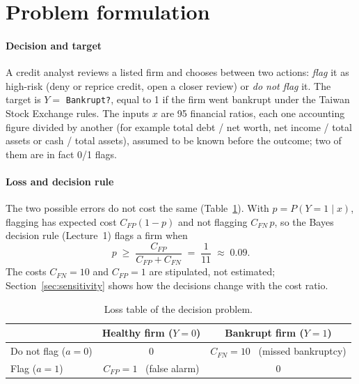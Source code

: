 \documentclass[11pt,a4paper]{article}
\newcommand{\tablefont}{\sffamily\small}
\begin{document}
\section{Problem formulation}

\paragraph{Decision and target} A credit analyst reviews a listed firm and chooses between two actions: \emph{flag} it as high-risk (deny or reprice credit, open a closer review) or \emph{do not flag} it. The target is $Y = $ \texttt{Bankrupt?}, equal to 1 if the firm went bankrupt under the Taiwan Stock Exchange rules. The inputs $x$ are 95 financial ratios, each one accounting figure divided by another (for example total debt / net worth, net income / total assets or cash / total assets), assumed to be known before the outcome; two of them are in fact 0/1 flags.

\paragraph{Loss and decision rule} The two possible errors do not cost the same (Table~\ref{tab:loss}). With $p = P(Y=1 \mid x)$, flagging has expected cost $C_{FP}(1-p)$ and not flagging $C_{FN}\,p$, so the Bayes decision rule (Lecture~1) flags a firm when
\begin{equation}\label{eq:bayes}
  p \;\ge\; \frac{C_{FP}}{C_{FP}+C_{FN}} \;=\; \frac{1}{11} \;\approx\; 0.09 .
\end{equation}
The costs $C_{FN}=10$ and $C_{FP}=1$ are stipulated, not estimated; Section~\ref{sec:sensitivity} shows how the decisions change with the cost ratio.

\begin{table}[htbp]\centering\tablefont
  \caption{Loss table of the decision problem.}\label{tab:loss}
  \begin{tabular}{lcc}
    \toprule
    & Healthy firm ($Y=0$) & Bankrupt firm ($Y=1$) \\
    \midrule
    Do not flag ($a=0$) & 0 & $C_{FN} = 10$ \ (missed bankruptcy) \\
    Flag ($a=1$) & $C_{FP} = 1$ \ (false alarm) & 0 \\
    \bottomrule
  \end{tabular}
\end{table}
\end{document}
